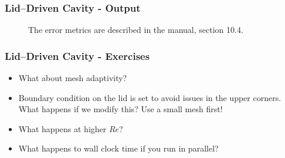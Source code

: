 \begin{frame}
    \frametitle{Lid--Driven Cavity - Output}
\begin{figure}
\centering
{}
\hspace{10mm}
\caption{The error metrics are described in the manual, section 10.4.}
\end{figure}
\end{frame}

\begin{frame}
  \frametitle{Lid--Driven Cavity - Exercises}
\begin{itemize}
\item What about mesh adaptivity?
\item Boundary condition on the lid is set to avoid issues in the upper corners. What happens if we modify this? Use a small mesh first!
\item What happens at higher $Re$?
\item What happens to wall clock time if you run in parallel?
\end{itemize}
\end{frame}






